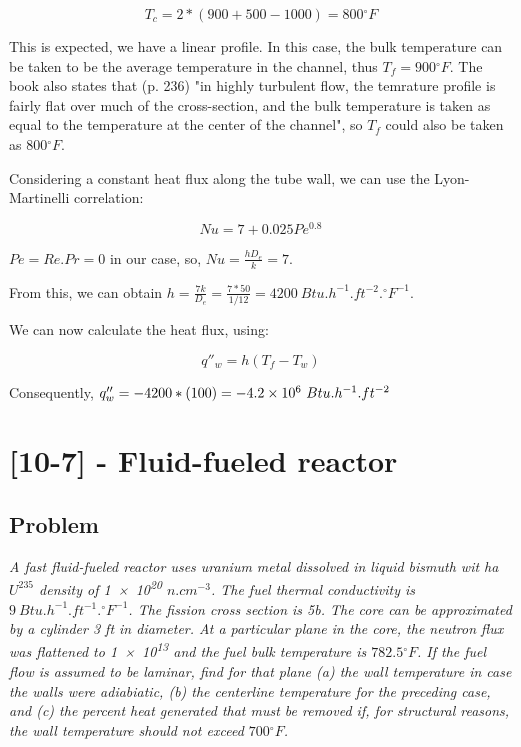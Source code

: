 \begin{equation}
T_c = 2*(900+500-1000) = 800{}^\circ F
\end{equation}

This is expected, we have a linear profile. In this case, the bulk temperature can be taken to be the average temperature in the channel, thus $T_f = 900{}^\circ F$. The book also states that (p. 236) "in highly turbulent flow, the temrature profile is fairly flat  over much of the cross-section, and the bulk temperature is taken as equal to the temperature at the center of the channel", so $T_f$ could also be taken as $800{}^\circ F$.

Considering a constant heat flux along the tube wall, we can use the Lyon-Martinelli correlation:

\begin{equation}
Nu = 7 + 0.025Pe^{0.8}
\end{equation}

$Pe = Re.Pr = 0$ in our case, so, $Nu = \frac{hD_e}{k} = 7$.

From this, we can obtain $h = \frac{7k}{D_e} = \frac{7 * 50}{1/12} = 4200\ Btu.h^{-1}.ft^{-2}.{}^\circ F^{-1}$.

We can now calculate the heat flux, using:

\begin{equation}
q''_w = h(T_f - T_w)
\end{equation}

Consequently, $q''_w = - 4200 * (100) = -\text{\num{4.2e6}}\ Btu.h^{-1}.ft^{-2}$

\section{[10-7] - Fluid-fueled reactor}
\label{prob102}


\subsection{Problem}
\textit{A fast fluid-fueled reactor uses uranium metal dissolved in liquid bismuth wit ha $U^{235}$ density of \num{1e20} $n.cm^{-3}$. The fuel thermal conductivity is $9\ Btu.h^{-1}.ft^{-1}.{}^\circ F^{-1}$. The fission cross section is 5b. The core can be approximated by a cylinder 3 ft in diameter. At a particular plane in the core, the neutron flux was flattened to \num{1e13} and the fuel bulk temperature is $782.5{}^\circ F$. If the fuel flow is assumed to be laminar, find for that plane (a) the wall temperature in case the walls were adiabiatic, (b) the centerline temperature for the preceding case, and (c) the percent heat generated that must be removed if, for structural reasons, the wall temperature should not exceed $700{}^\circ F$.}


